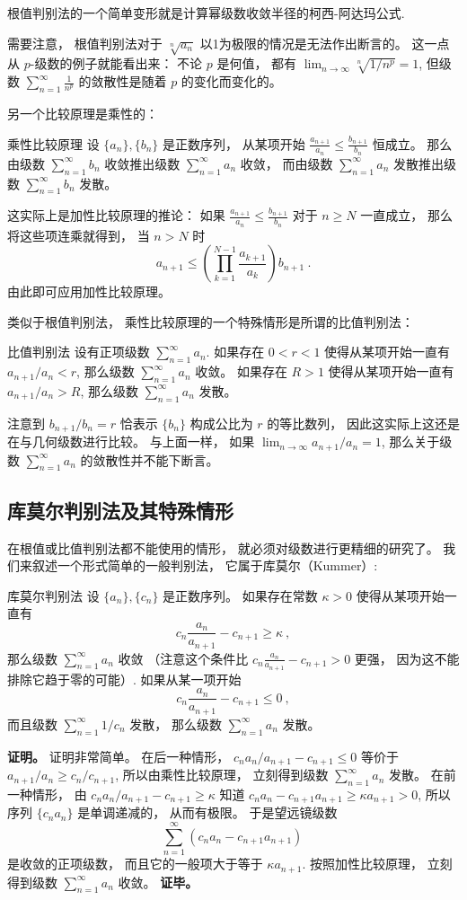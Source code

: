 根值判别法的一个简单变形就是计算幂级数收敛半径的柯西-阿达玛公式.

需要注意， 根值判别法对于 $\sqrt[n]{a_n}$ 以1为极限的情况是无法作出断言的。 这一点从 $p$-级数的例子就能看出来： 不论 $p$ 是何值， 都有 $\lim_{n\to\infty}\sqrt[n]{1/n^p}=1$, 但级数 $\sum_{n=1}^\infty\frac{1}{n^p}$ 的敛散性是随着 $p$ 的变化而变化的。

另一个比较原理是乘性的：
\begin{theorem}{乘性比较原理}
设 $\{a_n\},\{b_n\}$ 是正数序列， 从某项开始 $\frac{a_{n+1}}{a_n}\leq \frac{b_{n+1}}{b_n}$ 恒成立。 那么由级数 $\sum_{n=1}^\infty b_n$ 收敛推出级数 $\sum_{n=1}^\infty a_n$ 收敛， 而由级数 $\sum_{n=1}^\infty a_n$ 发散推出级数 $\sum_{n=1}^\infty b_n$ 发散。
\end{theorem}
这实际上是加性比较原理的推论： 如果 $\frac{a_{n+1}}{a_n}\leq \frac{b_{n+1}}{b_n}$ 对于 $n\geq N$ 一直成立， 那么将这些项连乘就得到， 当 $n>N$ 时
$$
a_{n+1}\leq \left(\prod_{k=1}^{N-1}\frac{a_{k+1}}{a_k}\right)b_{n+1}~.
$$
由此即可应用加性比较原理。

类似于根值判别法， 乘性比较原理的一个特殊情形是所谓的比值判别法：
\begin{theorem}{比值判别法}
设有正项级数 $\sum_{n=1}^\infty a_n$. 如果存在 $0<r<1$ 使得从某项开始一直有 $a_{n+1}/a_n<r$, 那么级数 $\sum_{n=1}^\infty a_n$ 收敛。 如果存在 $R>1$ 使得从某项开始一直有 $a_{n+1}/{a_n}>R$, 那么级数 $\sum_{n=1}^\infty a_n$ 发散。
\end{theorem}
注意到 $b_{n+1}/b_n=r$ 恰表示 $\{b_n\}$ 构成公比为 $r$ 的等比数列， 因此这实际上这还是在与几何级数进行比较。 与上面一样， 如果 $\lim_{n\to\infty}a_{n+1}/a_n=1$, 那么关于级数 $\sum_{n=1}^\infty a_n$ 的敛散性并不能下断言。

\subsection{库莫尔判别法及其特殊情形}
在根值或比值判别法都不能使用的情形， 就必须对级数进行更精细的研究了。 我们来叙述一个形式简单的一般判别法， 它属于库莫尔（Kummer）:

\begin{theorem}{库莫尔判别法}
设 $\{a_n\},\{c_n\}$ 是正数序列。 如果存在常数 $\kappa>0$ 使得从某项开始一直有
$$
c_n\frac{a_n}{a_{n+1}}-c_{n+1}\geq \kappa~,
$$
那么级数 $\sum_{n=1}^\infty a_n$ 收敛 （注意这个条件比 $c_n\frac{a_n}{a_{n+1}}-c_{n+1}>0$ 更强， 因为这不能排除它趋于零的可能）. 如果从某一项开始
$$
c_n\frac{a_n}{a_{n+1}}-c_{n+1} \leq0~,
$$
而且级数 $\sum_{n=1}^\infty 1/c_n$ 发散， 那么级数 $\sum_{n=1}^\infty a_n$ 发散。
\end{theorem}
\textbf{证明。} 证明非常简单。 在后一种情形， $c_n{a_n}/{a_{n+1}}-c_{n+1} \leq0$ 等价于 $a_{n+1}/a_n\geq c_{n}/c_{n+1}$, 所以由乘性比较原理， 立刻得到级数 $\sum_{n=1}^\infty a_n$ 发散。 在前一种情形， 由 $c_n{a_n}/{a_{n+1}}-c_{n+1}\geq \kappa$ 知道 $c_na_n-c_{n+1}a_{n+1}\geq \kappa a_{n+1}>0$, 所以序列 $\{c_na_n\}$ 是单调递减的， 从而有极限。 于是望远镜级数
$$
\sum_{n=1}^\infty (c_na_n-c_{n+1}a_{n+1})~
$$
是收敛的正项级数， 而且它的一般项大于等于 $\kappa a_{n+1}$. 按照加性比较原理， 立刻得到级数 $\sum_{n=1}^\infty a_n$ 收敛。 \textbf{证毕。}

